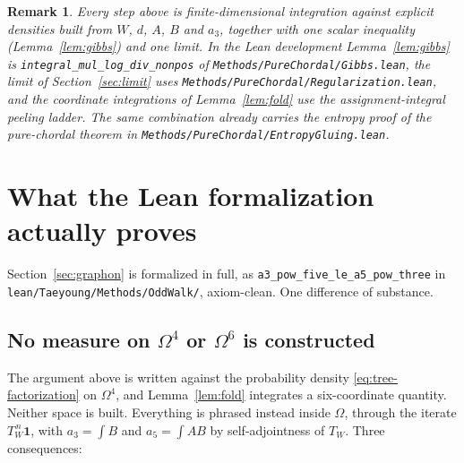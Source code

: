 \documentclass[11pt]{article}
\newtheorem{remark}[theorem]{Remark}
\begin{document}
\begin{remark}
Every step above is finite-dimensional integration against explicit densities
built from $W$, $d$, $A$, $B$ and $a_3$, together with one scalar inequality
(Lemma~\ref{lem:gibbs}) and one limit.  In the Lean development
Lemma~\ref{lem:gibbs} is \texttt{integral\_mul\_log\_div\_nonpos} of
\texttt{Methods/PureChordal/Gibbs.lean}, the limit of
Section~\ref{sec:limit} uses \texttt{Methods/PureChordal/Regularization.lean},
and the coordinate integrations of Lemma~\ref{lem:fold} use the
assignment-integral peeling ladder.  The same combination already carries the
entropy proof of the pure-chordal theorem in
\texttt{Methods/PureChordal/EntropyGluing.lean}.
\end{remark}

\appendix
\section{What the Lean formalization actually proves}

Section~\ref{sec:graphon} is formalized in full, as
\texttt{a3\_pow\_five\_le\_a5\_pow\_three} in
\texttt{lean/Taeyoung/Methods/OddWalk/}, axiom-clean.  One difference of
substance.

\subsection*{No measure on $\Omega^4$ or $\Omega^6$ is constructed}

The argument above is written against the probability density
\eqref{eq:tree-factorization} on $\Omega^4$, and Lemma~\ref{lem:fold}
integrates a six-coordinate quantity.  Neither space is built.  Everything is
phrased instead inside $\Omega$, through the iterate
$T_W^{\,n}\mathbf1$, with $a_3=\int B$ and $a_5=\int AB$ by self-adjointness of
$T_W$.  Three consequences:
\end{document}

